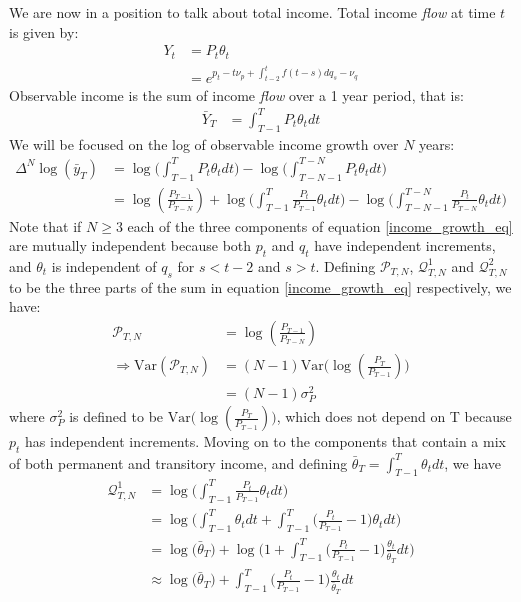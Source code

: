 We are now in a position to talk about total income. Total income \textit{flow} at time $t$ is given by:
\begin{align*}
Y_t &= P_t \theta_t \\
&= e^{p_t - t\nu_p + \int_{t-2}^{t} f(t-s)dq_s -\nu_q}
\end{align*}
Observable income is the sum of income \textit{flow} over a 1 year period, that is:
\begin{align*}
\bar{Y}_T &= \int_{T-1}^{T}P_t \theta_t dt 
\end{align*}
We will be focused on the log of observable income growth over $N$ years:
\begin{align}
\Delta^N\log(\bar{y}_T) &= \log\Big(\int_{T-1}^{T}P_t \theta_t dt \Big) - \log\Big(\int_{T-N-1}^{T-N}P_t \theta_t dt \Big) \nonumber \\
&= \log(\frac{P_{T-1}}{P_{T-N}})  + \log \Bigg(  \int_{T-1}^{T} \frac{P_t}{P_{T-1}} \theta_t dt\Bigg)  - \log \Bigg(  \int_{T-N-1}^{T-N}  \frac{P_t}{P_{T-N}} \theta_t  dt\Bigg) \label{income_growth_eq}
\end{align}
Note that if $N\geq3$ each of the three components of equation \ref{income_growth_eq} are mutually independent because both $p_t$ and $q_t$ have independent increments, and $\theta_t$ is independent of $q_s$ for $s<t-2$ and $s>t$. Defining $\mathcal{P}_{T,N}$, $\mathcal{Q}^1_{T,N}$ and $\mathcal{Q}^2_{T,N}$ to be the three parts of the sum in equation \ref{income_growth_eq} respectively, we have:
\begin{align*}
\mathcal{P}_{T,N} &= \log(\frac{P_{T-1}}{P_{T-N}}) \\
\Rightarrow \mathrm{Var}(\mathcal{P}_{T,N}) &= (N-1)\mathrm{Var}\Big(\log(\frac{P_{T}}{P_{T-1}})\Big) \\
&= (N-1)\sigma^2_P
\end{align*}
where $\sigma^2_P$ is defined to be $\mathrm{Var}\Big(\log(\frac{P_{T}}{P_{T-1}})\Big)$, which does not depend on T because $p_t$ has independent increments.
Moving on to the components that contain a mix of both permanent and transitory income, and defining $\bar{\theta}_T=\int_{T-1}^{T}\theta_t dt$, we have
\begin{align*}
\mathcal{Q}^1_{T,N} &= \log \Bigg(  \int_{T-1}^{T} \frac{P_t}{P_{T-1}} \theta_t dt\Bigg) \\
&= \log \Bigg(\int_{T-1}^{T}  \theta_t dt  +   \int_{T-1}^{T} \Big(\frac{P_t}{P_{T-1}}-1\Big)\theta_t dt\Bigg) \\
&= \log \Big(\bar{\theta}_T \Big) + \log \Bigg( 1+ \int_{T-1}^{T} \Big(\frac{P_t}{P_{T-1}}-1\Big)\frac{\theta_t}{\bar{\theta}_T} dt\Bigg) \\
&\approx \log \Big(\bar{\theta}_T \Big) + \int_{T-1}^{T} \Big(\frac{P_t}{P_{T-1}}-1\Big)\frac{\theta_t}{\bar{\theta}_T} dt
\end{align*}
